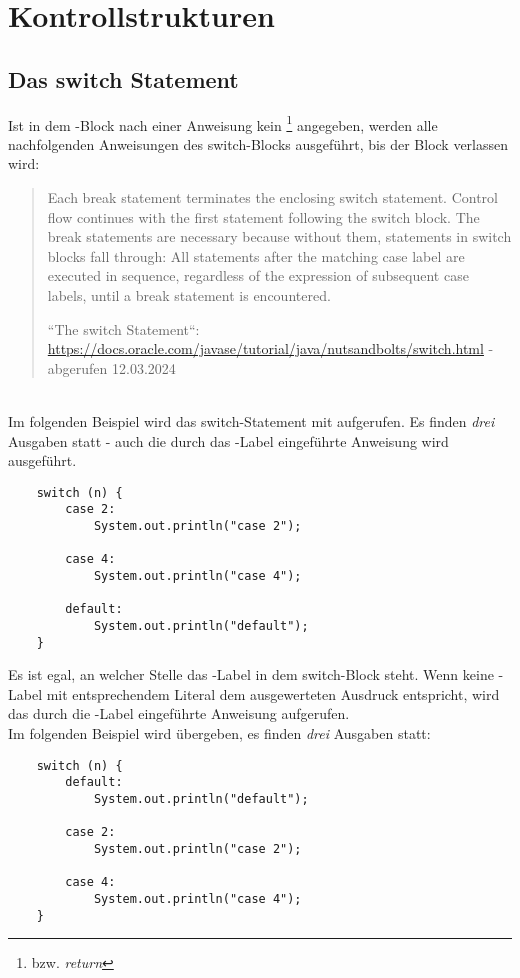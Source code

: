 \section{Kontrollstrukturen}


\subsection{Das switch Statement}

Ist in dem -Block nach einer Anweisung kein \footnote{bzw. \textit{return}} angegeben, werden alle nachfolgenden Anweisungen des switch-Blocks ausgeführt, bis der Block verlassen wird:

\blockquote[{``The switch Statement``: \url{https://docs.oracle.com/javase/tutorial/java/nutsandbolts/switch.html} - abgerufen 12.03.2024}]{
    Each break statement terminates the enclosing switch statement. Control flow continues with the first statement following the switch block. The break statements are necessary because without them, statements in switch blocks fall through: All statements after the matching case label are executed in sequence, regardless of the expression of subsequent case labels, until a break statement is encountered.
}\\

\noindent
Im folgenden Beispiel wird das switch-Statement mit  aufgerufen.
Es finden \textit{drei} Ausgaben statt - auch die durch das -Label eingeführte Anweisung wird ausgeführt.

\begin{verbatim}
    switch (n) {
        case 2:
            System.out.println("case 2");

        case 4:
            System.out.println("case 4");

        default:
            System.out.println("default");
    }
\end{verbatim}


\noindent
Es ist egal, an welcher Stelle das -Label in dem switch-Block steht.
Wenn keine -Label mit entsprechendem Literal dem ausgewerteten Ausdruck entspricht, wird das durch die -Label eingeführte Anweisung aufgerufen.\\

\noindent
Im folgenden Beispiel wird  übergeben, es finden \textit{drei} Ausgaben statt:

\begin{verbatim}
    switch (n) {
        default:
            System.out.println("default");

        case 2:
            System.out.println("case 2");

        case 4:
            System.out.println("case 4");
    }
\end{verbatim}
